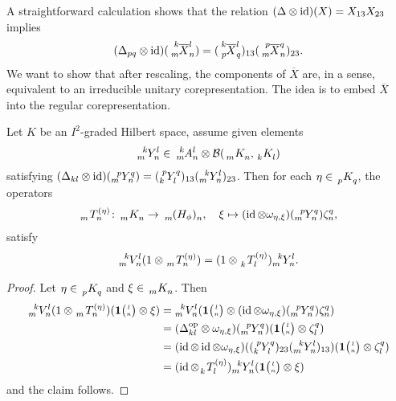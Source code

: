 A straightforward calculation shows that the relation $(\Delta\otimes \operatorname{id})(X)=X_{13}X_{23}$ implies
  \begin{align*}
    (\Delta_{pq} \otimes \id)(\Gr{\overline{X}}{k}{l}{m}{n}) =
     (\Gr{\overline{X}}{k}{l}{p}{q})_{13}(\Gr{\overline{X}}{p}{q}{m}{n})_{23}.
  \end{align*}
We want to show that after rescaling, the components  of $\overline{X}$ are, in a sense, equivalent to an irreducible unitary  corepresentation. The idea is to embed $\overline{X}$ into the regular corepresentation.
\begin{Lem} \label{lem:construct-intertwiner} Let $K$ be an $I^{2}$-graded Hilbert space, assume   given elements
  \begin{align*}
    \Gr{Y}{k}{l}{m}{n}\in \Gr{A}{k}{l}{m}{n} \otimes \mathcal{B}(\Grd{K}{m}{n},\Grd{K}{k}{l})
  \end{align*}
   satisfying $    (\Delta_{kl} \otimes \id)(\Gr{Y}{p}{q}{m}{n}) =
     (\Gr{Y}{p}{q}{k}{l})_{13}(\Gr{Y}{k}{l}{m}{n})_{23}
$. Then for each $\eta\in \Grd{K}{p}{q}$,  the operators
\begin{align*}
  \Gr{T}{}{(\eta)}{m}{n} \colon
\Grd{K}{m}{n} \to  \Grd{(H_{\phi})}{m}{n}, \quad \xi \mapsto (\id \otimes \omega_{\eta,\xi})(\Gr{Y}{p}{q}{m}{n}) \zeta^{q}_{n},
\end{align*}
satisfy
  \begin{align*}
    \Gr{V}{k}{l}{m}{n}(1\otimes \Gr{T}{}{(\eta)}{m}{n}) = (1 \otimes
    \Gr{T}{}{(\eta)}{k}{l})\Gr{Y}{k}{l}{m}{n}.
  \end{align*}
\end{Lem}
\begin{proof}
Let $\eta \in \Grd{K}{p}{q}$ and  $\xi \in \Grd{K}{m}{n}$. Then
  \begin{align*}
    \Gr{V}{k}{l}{m}{n}(1\otimes \Gr{T}{}{(\eta)}{m}{n})(\UnitC{l}{n}\otimes \xi) &= \Gr{V}{k}{l}{m}{n}(\UnitC{l}{n}
    \otimes (\id \otimes \omega_{\eta,\xi})(\Gr{Y}{p}{q}{m}{n})\zeta^{q}_{n}) \\ &= (\Delta_{kl}^{\op}    \otimes
    \omega_{\eta,\xi})(\Gr{Y}{p}{q}{m}{n})(\UnitC{l}{n}\otimes \zeta^{q}_{l}) \\
    &= (\id \otimes \id \otimes \omega_{\eta,\xi})((\Gr{Y}{p}{q}{k}{l})_{23}(\Gr{Y}{k}{l}{m}{n})_{13})(\UnitC{l}{n}\otimes
    \zeta^{q}_{l}) \\
    &= (\id \otimes \Gr{T}{}{(\eta)}{k}{l})\Gr{Y}{k}{l}{m}{n}(\UnitC{l}{n}\otimes \xi)
  \end{align*}
and the claim follows.
\end{proof}


